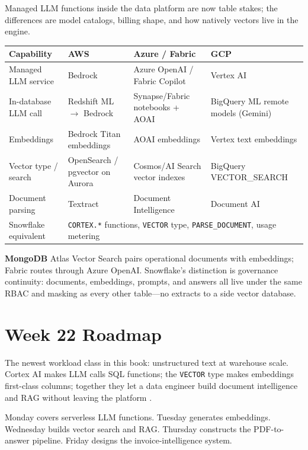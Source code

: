 \begin{crosscloud}
Managed LLM functions inside the data platform are now table stakes; the differences are model catalogs, billing shape, and how natively vectors live in the engine.

\vspace{2mm}
{\footnotesize
\begin{tabular}{@{}p{2.8cm}p{3.0cm}p{3.0cm}p{3.0cm}@{}}
\toprule
\textbf{Capability} & \textbf{AWS} & \textbf{Azure / Fabric} & \textbf{GCP} \\
\midrule
Managed LLM service & Bedrock & Azure OpenAI / Fabric Copilot & Vertex AI \\
In-database LLM call & Redshift ML $\rightarrow$ Bedrock & Synapse/Fabric notebooks + AOAI & BigQuery ML remote models (Gemini) \\
Embeddings & Bedrock Titan embeddings & AOAI embeddings & Vertex text embeddings \\
Vector type / search & OpenSearch / pgvector on Aurora & Cosmos/AI Search vector indexes & BigQuery VECTOR\_SEARCH \\
Document parsing & Textract & Document Intelligence & Document AI \\
\addlinespace
Snowflake equivalent & \multicolumn{3}{l}{\texttt{CORTEX.*} functions, \texttt{VECTOR} type, \texttt{PARSE\_DOCUMENT}, usage metering} \\
\bottomrule
\end{tabular}}

\vspace{1mm}
\textbf{MongoDB} Atlas Vector Search pairs operational documents with embeddings; Fabric routes through Azure OpenAI. Snowflake's distinction is governance continuity: documents, embeddings, prompts, and answers all live under the same RBAC and masking as every other table---no extracts to a side vector database.
\end{crosscloud}

\section{Week 22 Roadmap}
The newest workload class in this book: unstructured text at warehouse scale. Cortex AI makes LLM calls SQL functions; the \texttt{VECTOR} type makes embeddings first-class columns; together they let a data engineer build document intelligence and RAG without leaving the platform \cite{snowflakeCortexDocs}.

Monday covers serverless LLM functions. Tuesday generates embeddings. Wednesday builds vector search and RAG. Thursday constructs the PDF-to-answer pipeline. Friday designs the invoice-intelligence system.

